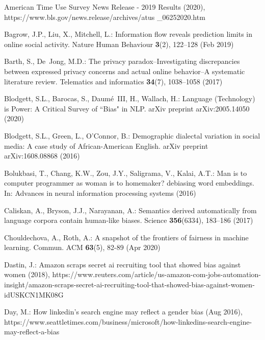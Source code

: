 \documentclass[11pt]{article} %
\begin{document}
\begin{thebibliography}{10}
\begin{small}
\itemsep=1pt


American {Time} {U}se {S}urvey {News} {Release} - 2019 {Results} (2020),
  https://www.bls.gov/news.release/archives/atus \_06252020.htm

Bagrow, J.P., Liu, X., Mitchell, L.: Information flow reveals prediction limits
  in online social activity. Nature Human Behaviour  \textbf{3}(2),  122--128
  (Feb 2019)

Barth, S., De~Jong, M.D.: The privacy paradox--{Investigating} discrepancies
  between expressed privacy concerns and actual online behavior–{A}
  systematic literature review. Telematics and informatics  \textbf{34}(7),
  1038--1058 (2017)

Blodgett, S.L., Barocas, S., Daumé~III, H., Wallach, H.: Language
  ({Technology}) is {Power}: {A} {Critical} {Survey} of  ``{Bias}" in {NLP}.
  arXiv preprint arXiv:2005.14050  (2020)

Blodgett, S.L., Green, L., O'Connor, B.: Demographic dialectal variation in
  social media: {A} case study of {African}-{American} {English}. arXiv
  preprint arXiv:1608.08868  (2016)

Bolukbasi, T., Chang, K.W., Zou, J.Y., Saligrama, V., Kalai, A.T.: Man is to
  computer programmer as woman is to homemaker? debiasing word embeddings. In:
  Advances in neural information processing systems (2016)

Caliskan, A., Bryson, J.J., Narayanan, A.: Semantics derived automatically from
  language corpora contain human-like biases. Science  \textbf{356}(6334),
  183--186 (2017)

Chouldechova, A., Roth, A.: A snapshot of the frontiers of fairness in machine
  learning. Commun. ACM  \textbf{63}(5),  82-89 (Apr 2020)

Dastin, J.: Amazon scraps secret ai recruiting tool that showed bias against
  women (2018),
  https://www.reuters.com/article/us-amazon-com-jobs-automation-insight/amazon-scraps-secret-ai-recruiting-tool-that-showed-bias-against-women-idUSKCN1MK08G

Day, M.: How linkedin's search engine may reflect a gender bias (Aug 2016),
  https://www.seattletimes.com/business/microsoft/how-linkedins-search-engine-may-reflect-a-bias


\end{small}
\end{thebibliography}
\end{document}
